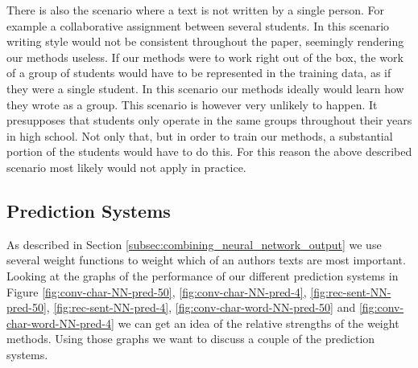 There is also the scenario where a text is not written by a single person. For
example a collaborative assignment between several students. In this scenario
writing style would not be consistent throughout the paper, seemingly rendering
our methods useless. If our methods were to work right out of the box, the work
of a group of students would have to be represented in the training data, as if
they were a single student. In this scenario our methods ideally would learn
how they wrote as a group. This scenario is however very unlikely to happen. It
presupposes that students only operate in the same groups throughout their years
in high school. Not only that, but in order to train our methods, a substantial
portion of the students would have to do this. For this reason the above
described scenario most likely would not apply in practice. 

\subsection{Prediction Systems}

As described in Section \ref{subsec:combining_neural_network_output}
we use several weight functions to weight which of an authors texts
are most important. Looking at the graphs of the performance of our
different prediction systems in Figure \ref{fig:conv-char-NN-pred-50},
\ref{fig:conv-char-NN-pred-4}, \ref{fig:rec-sent-NN-pred-50},
\ref{fig:rec-sent-NN-pred-4}, \ref{fig:conv-char-word-NN-pred-50} and
\ref{fig:conv-char-word-NN-pred-4} we can get an idea of the relative strengths
of the weight methods. Using those graphs we want to discuss a couple of the
prediction systems.


